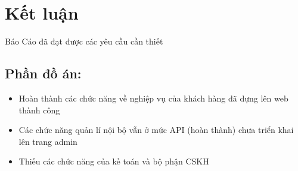 \vspace{10cm}

\section{Kết luận}

Báo Cáo đã đạt được các yêu cầu cần thiết
\subsection{Phần đồ án:}
\begin{itemize}
\item Hoàn thành các chức năng về nghiệp vụ của khách hàng đã dựng lên web thành công
\item Các chức năng quản lí nội bộ vẫn ở mức API (hoàn thành) chưa triển khai lên trang admin
\item Thiếu các chức năng của kế toán và bộ phận CSKH
\end{itemize}



